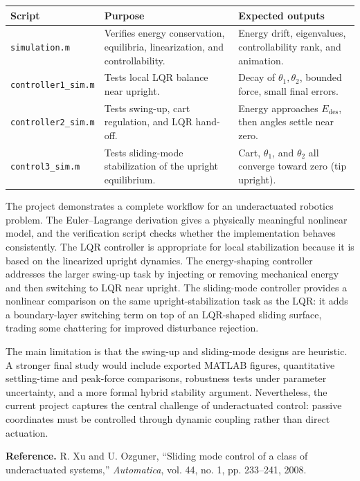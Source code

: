 \documentclass[11pt,a4paper]{article}
\begin{document}
\begin{center}
\small
\begin{tabular}{@{}L{0.20\textwidth}L{0.33\textwidth}L{0.34\textwidth}@{}}
\toprule
\textbf{Script} & \textbf{Purpose} & \textbf{Expected outputs}\\
\midrule
\texttt{simulation.m} & Verifies energy conservation, equilibria, linearization, and controllability. & Energy drift, eigenvalues, controllability rank, and animation.\\
\texttt{controller1\_sim.m} & Tests local LQR balance near upright. & Decay of $\theta_1,\theta_2$, bounded force, small final errors.\\
\texttt{controller2\_sim.m} & Tests swing-up, cart regulation, and LQR hand-off. & Energy approaches $E_{\mathrm{des}}$, then angles settle near zero.\\
\texttt{control3\_sim.m} & Tests sliding-mode stabilization of the upright equilibrium. & Cart, $\theta_1$, and $\theta_2$ all converge toward zero (tip upright).\\
\bottomrule
\end{tabular}
\end{center}

The project demonstrates a complete workflow for an underactuated robotics problem. The Euler--Lagrange derivation gives a physically meaningful nonlinear model, and the verification script checks whether the implementation behaves consistently. The LQR controller is appropriate for local stabilization because it is based on the linearized upright dynamics. The energy-shaping controller addresses the larger swing-up task by injecting or removing mechanical energy and then switching to LQR near upright. The sliding-mode controller provides a nonlinear comparison on the same upright-stabilization task as the LQR: it adds a boundary-layer switching term on top of an LQR-shaped sliding surface, trading some chattering for improved disturbance rejection.

The main limitation is that the swing-up and sliding-mode designs are heuristic. A stronger final study would include exported MATLAB figures, quantitative settling-time and peak-force comparisons, robustness tests under parameter uncertainty, and a more formal hybrid stability argument. Nevertheless, the current project captures the central challenge of underactuated control: passive coordinates must be controlled through dynamic coupling rather than direct actuation.

\vspace{0.5em}
\noindent\textbf{Reference.}
R. Xu and U. Ozguner, ``Sliding mode control of a class of underactuated systems,'' \emph{Automatica}, vol. 44, no. 1, pp. 233--241, 2008.
\end{document}
